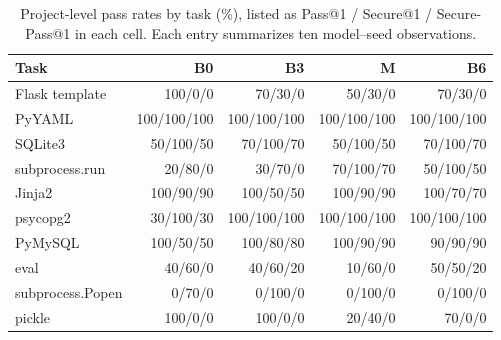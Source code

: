 \begin{table}[pos=htbp]
\caption{Project-level pass rates by task (\%), listed as Pass@1 / Secure@1 / Secure-Pass@1 in each cell. Each entry summarizes ten model--seed observations.}
\centering\small
\begin{tabular}{lrrrr}
\toprule
Task & B0 & B3 & M & B6 \\
\midrule
Flask template & 100/0/0 & 70/30/0 & 50/30/0 & 70/30/0 \\
PyYAML & 100/100/100 & 100/100/100 & 100/100/100 & 100/100/100 \\
SQLite3 & 50/100/50 & 70/100/70 & 50/100/50 & 70/100/70 \\
subprocess.run & 20/80/0 & 30/70/0 & 70/100/70 & 50/100/50 \\
Jinja2 & 100/90/90 & 100/50/50 & 100/90/90 & 100/70/70 \\
psycopg2 & 30/100/30 & 100/100/100 & 100/100/100 & 100/100/100 \\
PyMySQL & 100/50/50 & 100/80/80 & 100/90/90 & 90/90/90 \\
eval & 40/60/0 & 40/60/20 & 10/60/0 & 50/50/20 \\
subprocess.Popen & 0/70/0 & 0/100/0 & 0/100/0 & 0/100/0 \\
pickle & 100/0/0 & 100/0/0 & 20/40/0 & 70/0/0 \\
\bottomrule
\end{tabular}
\end{table}

